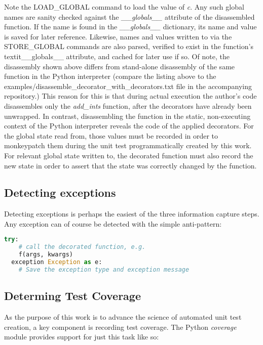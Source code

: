 

Note the LOAD\_GLOBAL command to load the value of \textit{c}.  Any such global names 
are sanity checked against the \textit{\_\_globals\_\_} attribute of the 
disassembled function.
%
If the name is found in the \textit{\_\_globals\_\_} dictionary, its name and 
value is saved for later reference.  Likewise, names and values written to via 
the STORE\_GLOBAL commands are also parsed, verified to exist in the function's
 textit{\_\_globals\_\_} attribute, and cached for later use if so.
%
Of note, the disassembly shown above differs from stand-alone disassembly of 
the same function in the Python interpreter (compare the listing above to the
 examples/disassemble\_decorator\_with\_decorators.txt file in the 
 accompanying repository.)
This reason for this is that during actual execution the author's code
 disassembles only the \textit{add\_ints} function, after the decorators
  have already been unwrapped.
In contrast, disassembling the function in the static, non-executing context of
the Python interpreter reveals the code of the applied decorators.  
%
For the global state read from, those values must be recorded 
in order to monkeypatch them during the unit test programmatically 
created by this work.
%
For relevant global state written to, the decorated function must also record
the new state in order to assert that the state was correctly changed by the function.

\subsection{Detecting exceptions}\label{sec:approach-internal-3}
Detecting exceptions is perhaps the easiest of the three information capture steps.
Any exception can of course be detected with the simple anti-pattern:

\begin{lstlisting}[language=Python]
  try:
    # call the decorated function, e.g.
    f(args, kwargs)
  exception Exception as e:
    # Save the exception type and exception message
  \end{lstlisting}

\subsection{Determing Test Coverage}\label{sec:approach-internal-4}
As the purpose of this work is to advance the science of automated unit test 
creation, a key component is recording test coverage.  The Python \textit{coverage}
module provides support for just this task like so:

